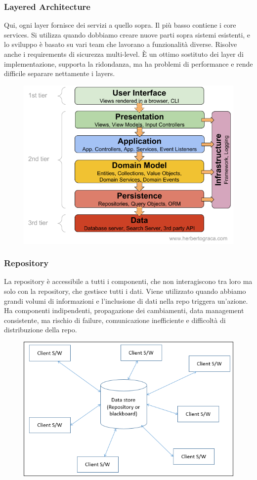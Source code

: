 \documentclass[11pt]{article}
\begin{document}
\subsubsection{Layered Architecture}
Qui, ogni layer fornisce dei servizi a quello sopra. Il più basso contiene i core services. Si utilizza quando dobbiamo creare nuove parti sopra sistemi esistenti, e lo sviluppo è basato su vari team che lavorano a funzionalità diverse. Risolve anche i requirements di sicurezza multi-level. È un ottimo sostituto dei layer di implementazione, supporta la ridondanza, ma ha problemi di performance e rende difficile separare nettamente i layers.
\begin{figure}[H]
    \includegraphics[width=\linewidth]{res/teoria/LayeredArchitecture.png}
\end{figure}
\subsubsection{Repository}
La repository è accessibile a tutti i componenti, che non interagiscono tra loro ma solo con la repository, che gestisce tutti i dati. Viene utilizzato quando abbiamo grandi volumi di informazioni e l'inclusione di dati nella repo triggera un'azione. Ha componenti indipendenti, propagazione dei cambiamenti, data management consistente, ma rischio di failure, comunicazione inefficiente e difficoltà di distribuzione della repo. 
\begin{figure}[H]
    \includegraphics[width=\linewidth]{res/teoria/Repository.jpg}
\end{figure}
\end{document}
